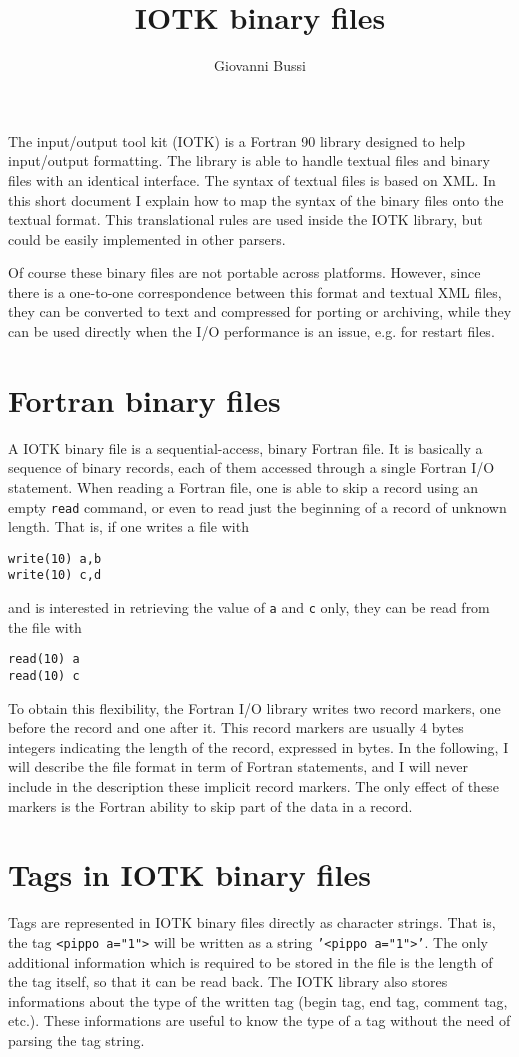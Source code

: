 \documentclass[12pt]{article}
\author{Giovanni Bussi}
\title{IOTK binary files}
\begin{document}
\maketitle

The input/output tool kit (IOTK) is a Fortran 90
library designed to help input/output formatting.
The library is able to handle textual files and
binary files with an identical interface.
The syntax of textual files is based on XML.
In this short document I explain how to map
the syntax of the binary files onto the textual
format.
This translational rules are used inside the
IOTK library, but could be easily implemented
in other parsers.

Of course these binary files are not portable across
platforms. However, since there is a one-to-one
correspondence between this format and
textual XML files, they can be
converted to text and compressed for porting or
archiving,
while they can be used directly when the
I/O performance is an issue, e.g. for restart files.

\section{Fortran binary files}
A IOTK binary file is a sequential-access, binary
Fortran file.
It is basically a sequence of binary records,
each of them accessed through a single Fortran
I/O statement.
When reading a Fortran file, one is able to skip
a record using an empty {\tt read} command,
or even to read just the beginning of a record
of unknown length.
That is, if one writes a file with
\begin{verbatim}
write(10) a,b
write(10) c,d
\end{verbatim}
and is interested in retrieving the value of
{\tt a} and {\tt c} only, they can be read from
the file with
\begin{verbatim}
read(10) a
read(10) c
\end{verbatim}
To obtain this flexibility, the Fortran I/O
library writes two record markers, one before the record
and one after it.
This record markers are usually 4 bytes integers indicating
the length of the record, expressed in bytes.
In the following, I will describe the file format
in term of Fortran statements, and I
will never include in the description these implicit
record markers. The only effect of these markers is
the Fortran ability to skip part of the data in a record.

\section{Tags in IOTK binary files}
Tags are represented in IOTK binary files directly
as character strings. That is, the tag
{\tt <pippo a="1">} will be written
as a string {\tt '<pippo a="1">'}.
The only additional information which is required to
be stored in the file is the length of the tag itself,
so that it can be read back. The IOTK library
also stores informations about the type of 
the written tag (begin tag, end tag,
comment tag, etc.). These informations are useful
to know the type of a tag without the need of parsing
the tag string.
\end{document}
